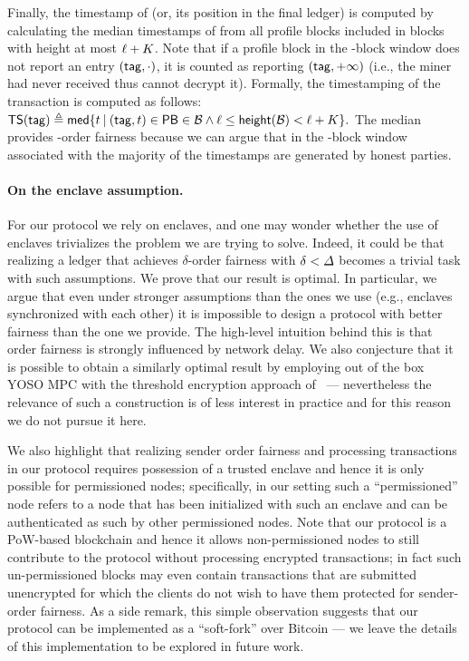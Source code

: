 Finally, the timestamp of \tx (or, its position in the final ledger) is computed by calculating the median timestamps of \txTag from all profile blocks included in blocks with height at most $\ell + K$.
%
Note that if a profile block in the \PBWindowLen-block window does not report an entry $(\mathsf{tag}, \cdot)$, it is counted as reporting $(\mathsf{tag}, +\infty)$ (i.e., the miner had never received \tx thus cannot decrypt it).
%
Formally, the timestamping of the transaction is computed as follows:
%
\( \mathsf{TS}(\mathsf{tag}) \triangleq \mathsf{med} \{ t \mathbin|  (\mathsf{tag}, t) \in \mathsf{PB} \in \mathcal{B} \wedge \ell \le \mathsf{height}(\mathcal{B}) < \ell + K\}. \)
%
The median provides \delay-order fairness because we can argue that in the \PBWindowLen-block window associated with \txTag the majority of the timestamps are generated by honest parties.

\paragraph{On the enclave assumption.}
%
For our protocol we rely on enclaves, and one may wonder whether the use of enclaves trivializes the problem we are trying to solve.
%
Indeed, it could be that realizing a ledger that achieves $\delta$-order fairness with $\delta < \varDelta$ becomes a trivial task with such assumptions.
%
We prove that our result is optimal.
%
In particular, we argue that even under stronger assumptions than the ones we use (e.g., enclaves synchronized with each other) it is impossible to design a protocol with better fairness than the one we provide.
%
The high-level intuition behind this is that order fairness is strongly influenced by network delay.
%
We also conjecture that it is possible to obtain a similarly optimal result by employing out of the box YOSO MPC \cite{TCC:BGGHKL20} with the threshold encryption approach of~\cite{TOKENOMICS:MalSza23} --- nevertheless the relevance of such a construction is of less interest in practice and for this reason we do not pursue it here.

We also highlight that realizing sender order fairness and processing transactions in our protocol requires possession of a trusted enclave and hence it is only possible for permissioned nodes; specifically, in our setting such a ``permissioned'' node refers to a node that has been initialized with such an enclave and can be authenticated as such by other permissioned nodes.
%
Note that our protocol is a PoW-based blockchain and hence it allows non-permissioned nodes to still contribute to the protocol without processing encrypted transactions; in fact such un-permissioned blocks may even contain transactions that are submitted unencrypted for which the clients do not wish to have them protected for sender-order fairness.
%
As a side remark, this simple observation suggests that our protocol can be implemented as a ``soft-fork'' over Bitcoin --- we leave the details of this implementation to be explored in future work.

